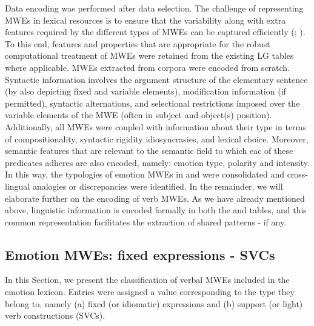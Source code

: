 \documentclass[output=paper]{langsci/langscibook}
\begin{document}
Data encoding was performed after data selection. The challenge of
representing MWEs in lexical resources is to ensure that the
variability along with extra features required by the different types
of MWEs can be captured efficiently (\citealt{calzolari2002}; \citealt{copestake2002}). To this end, features and properties that are appropriate
for the robust computational treatment of MWEs were retained from the
existing LG tables where applicable. MWEs extracted from corpora were
encoded from scratch. Syntactic information involves the argument structure
of the elementary sentence (by also depicting fixed and variable
elements), modification information (if permitted), syntactic
alternations, and selectional restrictions imposed over the variable
elements of the MWE (often in subject and object(s) position).
Additionally, all MWEs were coupled with information about their type
in terms of compositionality, syntactic rigidity idiosyncrasies,
and lexical choice. Moreover, semantic features that are relevant to
the semantic field to which eac of these predicates adheres are also encoded, namely:
emotion type, polarity and  intensity. In this way, the typologies of
emotion MWEs in  and  were consolidated and  cross-lingual analogies
or discrepancies were identified. In the remainder, we will elaborate
further on the encoding of verb MWEs. As we have already mentioned
above, linguistic information is encoded formally in both the  and 
tables, and this common representation facilitates the extraction of shared patterns - if any.


\subsection{Emotion MWEs: fixed expressions - SVCs }
\label{section51}


In this Section, we present the classification of verbal MWEs included in the emotion lexicon. Entries were assigned a value
corresponding to the type they belong to, namely (a) fixed (or
idiomatic) expressions and (b) support (or light) verb constructions
(SVCs).
\end{document}
